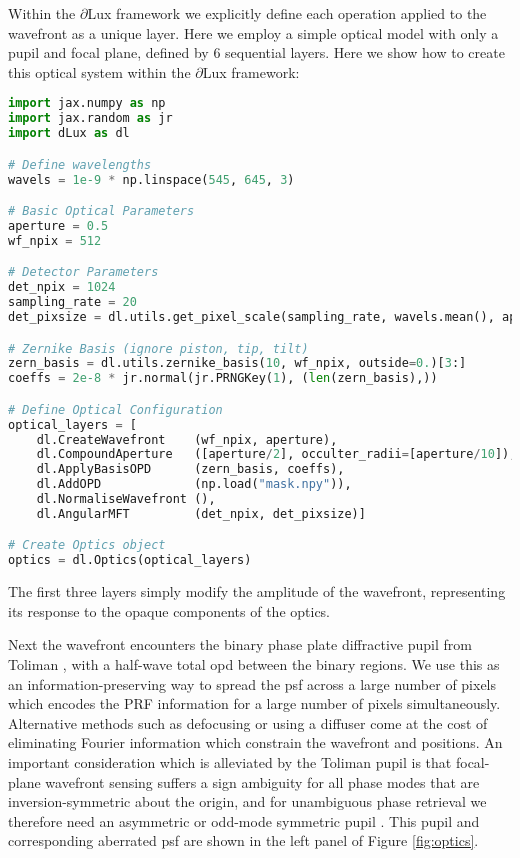 \documentclass[]{spieman}
\begin{document}
Within the $\partial$Lux framework we explicitly define each operation applied to the wavefront as a unique layer. Here we employ a simple optical model with only a pupil and focal plane, defined by 6 sequential layers. Here we show how to create this optical system within the $\partial$Lux framework:

\newpage

\begin{lstlisting}[language=Python,frame=single]
import jax.numpy as np
import jax.random as jr
import dLux as dl

# Define wavelengths
wavels = 1e-9 * np.linspace(545, 645, 3)

# Basic Optical Parameters
aperture = 0.5
wf_npix = 512

# Detector Parameters
det_npix = 1024
sampling_rate = 20
det_pixsize = dl.utils.get_pixel_scale(sampling_rate, wavels.mean(), aperture)

# Zernike Basis (ignore piston, tip, tilt)
zern_basis = dl.utils.zernike_basis(10, wf_npix, outside=0.)[3:]
coeffs = 2e-8 * jr.normal(jr.PRNGKey(1), (len(zern_basis),))

# Define Optical Configuration
optical_layers = [
    dl.CreateWavefront    (wf_npix, aperture),
    dl.CompoundAperture   ([aperture/2], occulter_radii=[aperture/10]),
    dl.ApplyBasisOPD      (zern_basis, coeffs),
    dl.AddOPD             (np.load("mask.npy")),
    dl.NormaliseWavefront (),
    dl.AngularMFT         (det_npix, det_pixsize)]

# Create Optics object
optics = dl.Optics(optical_layers)
\end{lstlisting}

The first three layers simply modify the amplitude of the wavefront, representing its response to the opaque components of the optics. 

Next the wavefront encounters the binary phase plate diffractive pupil from Toliman \cite{tuthill2018}, with a half-wave total \ac{opd} between the binary regions. We use this as an information-preserving way to spread the \ac{psf} across a large number of pixels which encodes the PRF information for a large number of pixels simultaneously. Alternative methods such as defocusing or using a diffuser \cite{Stefansson2017} come at the cost of eliminating Fourier information which constrain the wavefront and positions. An important consideration which is alleviated by the Toliman pupil is that focal-plane wavefront sensing suffers a sign ambiguity for all phase modes that are inversion-symmetric about the origin, and for unambiguous phase retrieval we therefore need an asymmetric or odd-mode symmetric pupil \cite{Martinache2013}. This pupil and corresponding aberrated \ac{psf} are shown in the left panel of Figure \ref{fig:optics}.
\end{document}
